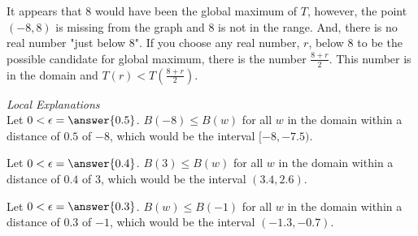 \documentclass{ximera}
\begin{document}
It appears that $8$ would have been the global maximum of $T$, however, the point $(-8, 8)$ is missing from the graph and $8$ is not in the range.  And, there is no real number "just below $8$".  If you choose any real number, $r$, below $8$ to be the possible candidate for global maximum, there is the number $\frac{8+r}{2}$. This number is in the domain and $T(r) < T\left(\frac{8+r}{2}\right)$.




\textit{Local Explanations} \\

Let $0 < \epsilon = \answer{0.5}$.  $B(-8) \leq B(w)$ for all $w$ in the domain within a distance of $0.5$ of $-8$, which would be the interval $[-8, -7.5)$.

Let $0 < \epsilon = \answer{0.4}$.  $B(3) \leq B(w)$ for all $w$ in the domain within a distance of $0.4$ of $3$, which would be the interval $(3.4, 2.6)$.

Let $0 < \epsilon = \answer{0.3}$.  $B(w) \leq B(-1)$ for all $w$ in the domain within a distance of $0.3$ of $-1$, which would be the interval $(-1.3, -0.7)$.
\end{document}
